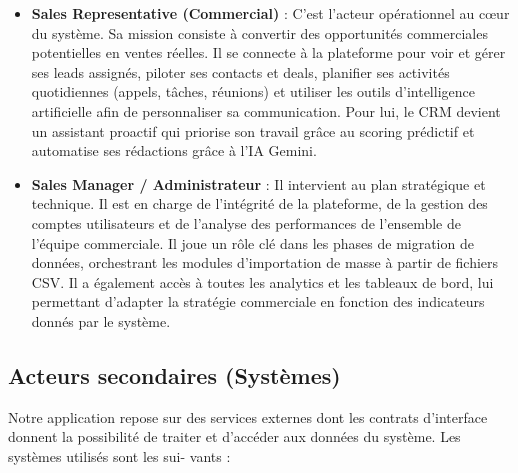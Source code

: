 \begin{itemize}
    \item \textbf{Sales Representative (Commercial)} : C’est l’acteur opérationnel au cœur du système.
    Sa mission consiste à convertir des opportunités commerciales potentielles en ventes
    réelles. Il se connecte à la plateforme pour voir et gérer ses leads assignés, piloter ses
    contacts et deals, planifier ses activités quotidiennes (appels, tâches, réunions) et utiliser
    les outils d’intelligence artificielle afin de personnaliser sa communication. Pour lui, le
    CRM devient un assistant proactif qui priorise son travail grâce au scoring prédictif et
    automatise ses rédactions grâce à l’IA Gemini.
    
    \item \textbf{Sales Manager / Administrateur} : Il intervient au plan stratégique et technique. Il
    est en charge de l’intégrité de la plateforme, de la gestion des comptes utilisateurs et
    de l’analyse des performances de l’ensemble de l’équipe commerciale. Il joue un rôle
    clé dans les phases de migration de données, orchestrant les modules d’importation de
    masse à partir de fichiers CSV. Il a également accès à toutes les analytics et les tableaux
    de bord, lui permettant d’adapter la stratégie commerciale en fonction des indicateurs
    donnés par le système.
\end{itemize}

\subsection*{Acteurs secondaires (Systèmes)}

Notre application repose sur des services externes dont les contrats d’interface donnent la possibilité de traiter et d’accéder aux données du système. Les systèmes utilisés sont les sui-
vants :

